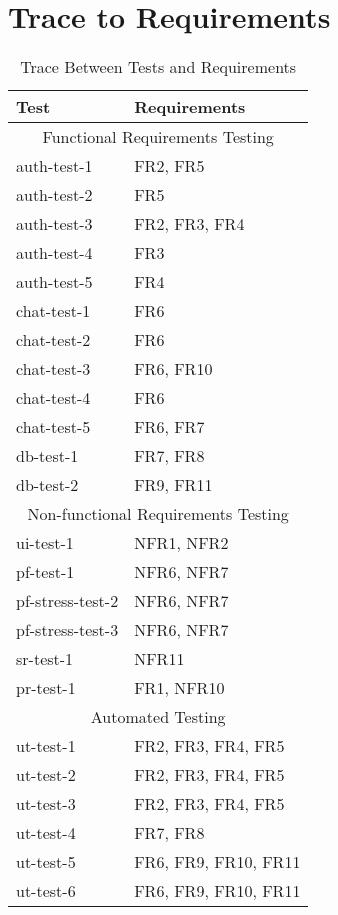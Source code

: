 \documentclass[12pt, titlepage]{article}
\begin{document}
	    \begin{table}[!htbp]
	    \section{Trace to Requirements}
			\begin{tabularx}{\textwidth}{p{3cm}X}
				\toprule
				Test & Requirements \\
				\midrule
				\multicolumn{2}{c}{Functional Requirements Testing} \\
				\midrule
				auth-test-1 & FR2, FR5 \\
                auth-test-2 & FR5\\
                auth-test-3 & FR2, FR3, FR4\\
                auth-test-4 & FR3\\
                auth-test-5 & FR4\\
                chat-test-1 & FR6\\
                chat-test-2 & FR6\\
                chat-test-3 & FR6, FR10\\
                chat-test-4 & FR6\\
                chat-test-5 & FR6, FR7\\
                db-test-1 & FR7, FR8\\
                db-test-2 & FR9, FR11\\
				\midrule
				\multicolumn{2}{c}{Non-functional Requirements Testing} \\
				\midrule
                ui-test-1 & NFR1, NFR2\\
                pf-test-1 & NFR6, NFR7\\
                pf-stress-test-2 & NFR6, NFR7\\
                pf-stress-test-3 & NFR6, NFR7\\
                sr-test-1 & NFR11\\
                pr-test-1 & FR1, NFR10\\
				\midrule
				\multicolumn{2}{c}{Automated Testing} \\
				\midrule
				ut-test-1 & FR2, FR3, FR4, FR5\\ %
				ut-test-2 & FR2, FR3, FR4, FR5\\ %
				ut-test-3 & FR2, FR3, FR4, FR5 \\ %
				ut-test-4 & FR7, FR8\\ %
				ut-test-5 & FR6, FR9, FR10, FR11\\ %
				ut-test-6 & FR6, FR9, FR10, FR11\\ %
				\bottomrule
			\end{tabularx}
			\caption{Trace Between Tests and Requirements}
			\makeatletter
			\def\rulecolor#1#{\CT@arc{#1}}
			\def\CT@arc#1#2{%
				\ifdim\baselineskip=\z@\noalign\fi
				{\gdef\CT@arc@{\color#1{#2}}}}
			\let\CT@arc@\relax
			\makeatother
			\label{Table}
		\end{table}
\end{document}

